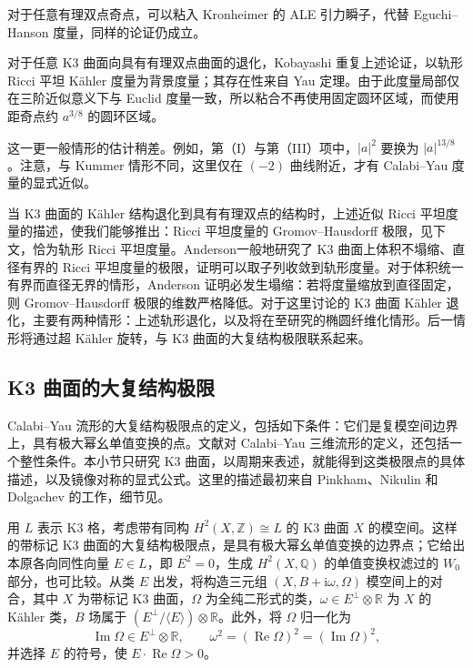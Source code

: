 \begin{note}[numbered]\label{note:7.23}
对于任意有理双点奇点，可以粘入 Kronheimer 的 ALE 引力瞬子，代替 Eguchi--Hanson 度量，同样的论证仍成立。
\end{note}

对于任意 K3 曲面向具有有理双点曲面的退化，Kobayashi 重复上述论证，以轨形 Ricci 平坦 Kähler 度量为背景度量；其存在性来自 Yau 定理。由于此度量局部仅在三阶近似意义下与 Euclid 度量一致，所以粘合不再使用固定圆环区域，而使用距奇点约 $a^{3/8}$ 的圆环区域。

这一更一般情形的估计稍差。例如，第（I）与第（III）项中，$|a|^2$ 要换为 $|a|^{13/8}$。注意，与 Kummer 情形不同，这里仅在 $(-2)$ 曲线附近，才有 Calabi--Yau 度量的显式近似。

当 K3 曲面的 Kähler 结构退化到具有有理双点的结构时，上述近似 Ricci 平坦度量的描述，使我们能够推出：Ricci 平坦度量的 Gromov--Hausdorff 极限，见下文，恰为轨形 Ricci 平坦度量。Anderson一般地研究了 K3 曲面上体积不塌缩、直径有界的 Ricci 平坦度量的极限，证明可以取子列收敛到轨形度量。对于体积统一有界而直径无界的情形，Anderson 证明必发生塌缩：若将度量缩放到直径固定，则 Gromov--Hausdorff 极限的维数严格降低。对于这里讨论的 K3 曲面 Kähler 退化，主要有两种情形：上述轨形退化，以及将在至研究的椭圆纤维化情形。后一情形将通过超 Kähler 旋转，与 K3 曲面的大复结构极限联系起来。

\subsection{K3 曲面的大复结构极限}\label{sec:7.3.2}

Calabi--Yau 流形的大复结构极限点的定义，包括如下条件：它们是复模空间边界上，具有极大幂幺单值变换的点。文献对 Calabi--Yau 三维流形的定义，还包括一个整性条件。本小节只研究 K3 曲面，以周期来表述，就能得到这类极限点的具体描述，以及镜像对称的显式公式。这里的描述最初来自 Pinkham、Nikulin 和 Dolgachev 的工作，细节见。

用 $L$ 表示 K3 格，考虑带有同构 $H^2(X,\mathbb Z)\cong L$ 的 K3 曲面 $X$ 的模空间。这样的带标记 K3 曲面的大复结构极限点，是具有极大幂幺单值变换的边界点；它给出本原各向同性向量 $E\in L$，即 $E^2=0$，生成 $H^2(X,\mathbb Q)$ 的单值变换权滤过的 $W_0$ 部分，也可比较。从类 $E$ 出发，将构造三元组 $(X,B+\mathrm i\omega,\Omega)$ 模空间上的对合，其中 $X$ 为带标记 K3 曲面，$\Omega$ 为全纯二形式的类，$\omega\in E^\perp\otimes\mathbb R$ 为 $X$ 的 Kähler 类，$B$ 场属于 $(E^\perp/\langle E\rangle)\otimes\mathbb R$。此外，将 $\Omega$ 归一化为
\[
\operatorname{Im}\Omega\in E^\perp\otimes\mathbb R,
\qquad\omega^2=(\operatorname{Re}\Omega)^2=(\operatorname{Im}\Omega)^2,
\]
并选择 $E$ 的符号，使 $E\cdot\operatorname{Re}\Omega>0$。

